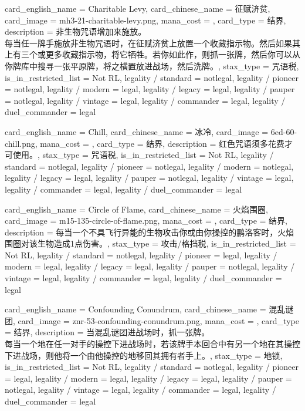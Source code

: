 \documentclass[lang = cn, color = black, 10pt]{AllThatStax}
\begin{document}
\card
{
	card_english_name = {Charitable Levy},
	card_chinese_name = {征赋济贫},
	card_image = mh3-21-charitable-levy.png,
	mana_cost = ,
	card_type = 结界,
	description = {非生物咒语增加来施放。\\
每当任一牌手施放非生物咒语时，在征赋济贫上放置一个收藏指示物。然后如果其上有三个或更多收藏指示物，将它牺牲。若你如此作，则抓一张牌，然后你可以从你牌库中搜寻一张平原牌，将之横置放进战场，然后洗牌。},
	stax_type = 咒语税,
	is_in_restricted_list = Not RL,
	legality / standard = notlegal,
	legality / pioneer = notlegal,
	legality / modern = legal,
	legality / legacy = legal,
	legality / pauper = notlegal,
	legality / vintage = legal,
	legality / commander = legal,
	legality / duel_commander = legal
}

\card
{
	card_english_name = {Chill},
	card_chinese_name = {冰冷},
	card_image = 6ed-60-chill.png,
	mana_cost = ,
	card_type = 结界,
	description = {红色咒语须多花费才可使用。},
	stax_type = 咒语税,
	is_in_restricted_list = Not RL,
	legality / standard = notlegal,
	legality / pioneer = notlegal,
	legality / modern = notlegal,
	legality / legacy = legal,
	legality / pauper = notlegal,
	legality / vintage = legal,
	legality / commander = legal,
	legality / duel_commander = legal
}

\card
{
	card_english_name = {Circle of Flame},
	card_chinese_name = {火焰围圈},
	card_image = m15-135-circle-of-flame.png,
	mana_cost = ,
	card_type = 结界,
	description = {每当一个不具飞行异能的生物攻击你或由你操控的鹏洛客时，火焰围圈对该生物造成1点伤害。},
	stax_type = 攻击/格挡税,
	is_in_restricted_list = Not RL,
	legality / standard = notlegal,
	legality / pioneer = legal,
	legality / modern = legal,
	legality / legacy = legal,
	legality / pauper = notlegal,
	legality / vintage = legal,
	legality / commander = legal,
	legality / duel_commander = legal
}

\card
{
	card_english_name = {Confounding Conundrum},
	card_chinese_name = {混乱谜团},
	card_image = znr-53-confounding-conundrum.png,
	mana_cost = ,
	card_type = 结界,
	description = {当混乱谜团进战场时，抓一张牌。\\
每当一个地在任一对手的操控下进战场时，若该牌手本回合中有另一个地在其操控下进战场，则他将一个由他操控的地移回其拥有者手上。},
	stax_type = 地锁,
	is_in_restricted_list = Not RL,
	legality / standard = notlegal,
	legality / pioneer = legal,
	legality / modern = legal,
	legality / legacy = legal,
	legality / pauper = notlegal,
	legality / vintage = legal,
	legality / commander = legal,
	legality / duel_commander = legal
}
\end{document}
